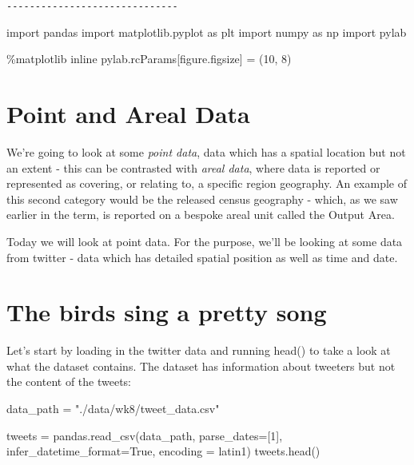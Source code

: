 \documentclass[
  letterpaper,
  DIV=11,
  numbers=noendperiod]{scrreprt}
\newenvironment{Shaded}{\begin{snugshade}}{\end{snugshade}}
\newcommand{\DecValTok}[1]{\textcolor[rgb]{0.68,0.00,0.00}{#1}}
\newcommand{\ImportTok}[1]{\textcolor[rgb]{0.00,0.46,0.62}{#1}}
\newcommand{\NormalTok}[1]{\textcolor[rgb]{0.00,0.23,0.31}{#1}}
\newcommand{\OperatorTok}[1]{\textcolor[rgb]{0.37,0.37,0.37}{#1}}
\newcommand{\StringTok}[1]{\textcolor[rgb]{0.13,0.47,0.30}{#1}}
\newcommand{\VariableTok}[1]{\textcolor[rgb]{0.07,0.07,0.07}{#1}}
\begin{document}
\texttt{-\/-\/-\/-\/-\/-\/-\/-\/-\/-\/-\/-\/-\/-\/-\/-\/-\/-\/-\/-\/-\/-\/-\/-\/-\/-\/-\/-\/-\/-}

\begin{Shaded}
\begin{Highlighting}[]
\ImportTok{import}\NormalTok{ pandas}
\ImportTok{import}\NormalTok{ matplotlib.pyplot }\ImportTok{as}\NormalTok{ plt}
\ImportTok{import}\NormalTok{ numpy }\ImportTok{as}\NormalTok{ np}
\ImportTok{import}\NormalTok{ pylab}

\OperatorTok{\%}\NormalTok{matplotlib inline}
\NormalTok{pylab.rcParams[}\StringTok{\textquotesingle{}figure.figsize\textquotesingle{}}\NormalTok{] }\OperatorTok{=}\NormalTok{ (}\DecValTok{10}\NormalTok{, }\DecValTok{8}\NormalTok{)}
\end{Highlighting}
\end{Shaded}

\hypertarget{point-and-areal-data}{%
\section{Point and Areal Data}\label{point-and-areal-data}}

We're going to look at some \emph{point data}, data which has a spatial
location but not an extent - this can be contrasted with \emph{areal
data}, where data is reported or represented as covering, or relating
to, a specific region geography. An example of this second category
would be the released census geography - which, as we saw earlier in the
term, is reported on a bespoke areal unit called the Output Area.

Today we will look at point data. For the purpose, we'll be looking at
some data from twitter - data which has detailed spatial position as
well as time and date.

\hypertarget{the-birds-sing-a-pretty-song}{%
\section{The birds sing a pretty
song}\label{the-birds-sing-a-pretty-song}}

Let's start by loading in the twitter data and running head() to take a
look at what the dataset contains. The dataset has information about
tweeters but not the content of the tweets:

\begin{Shaded}
\begin{Highlighting}[]
\NormalTok{data\_path }\OperatorTok{=} \StringTok{"./data/wk8/tweet\_data.csv"}

\NormalTok{tweets }\OperatorTok{=}\NormalTok{ pandas.read\_csv(data\_path, parse\_dates}\OperatorTok{=}\NormalTok{[}\DecValTok{1}\NormalTok{], infer\_datetime\_format}\OperatorTok{=}\VariableTok{True}\NormalTok{, encoding }\OperatorTok{=} \StringTok{\textquotesingle{}latin1\textquotesingle{}}\NormalTok{)}
\NormalTok{tweets.head()}
\end{Highlighting}
\end{Shaded}
\end{document}
